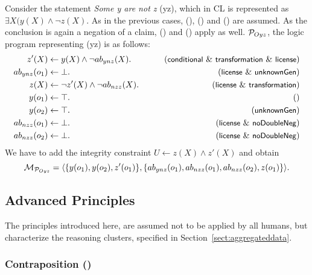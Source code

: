 \documentclass[12pt]{article}
\begin{document}
Consider the statement \textit{Some y are not z} ({\MO yz}), which in CL is represented as $\exists X (y(X) \wedge \neg z(X)$.
As in the previous cases, (\conditionals), (\licenses) and (\unknownGen) are assumed.
As the conclusion is again a negation of a claim, (\transformation) and
(\dnegation) apply as well. ${\cal P}_{Oyz}$, the logic program representing (\MO yz) is as follows:
\begin{align}
z'(X) & \leftarrow y(X) \wedge \neg \Ab_{ynz}(X). & \tag{\conditionals\ \&\ \transformation \ \&\ \licenses} \\
\Ab_{ynz}(o_1) & \leftarrow \bot. & \tag{\licenses\ \& \unknownGen} \\
z(X) & \leftarrow  \neg z'(X) \wedge \neg \Ab_{nzz}(X). &
\tag{\licenses\ \&\ \transformation} \\
y(o_1) & \leftarrow \top. & \tag{} \\
y(o_2) & \leftarrow \top. & \tag{\unknownGen} \\
\Ab_{nzz}(o_1)& \leftarrow \bot. & \tag{\licenses\ \&\ \dnegation}\\
\Ab_{nzz}(o_2)& \leftarrow \bot. & \tag{\licenses\ \&\ \dnegation}
\end{align}
We have to add the integrity constraint $U \leftarrow z(X) \wedge
z'(X)$
and obtain \[{\cal M}_{{\cal P}_{Oyz}} = \langle \{y(o_1), y(o_2), z'(o_1)\},\{ab_{ynz}(o_1),
ab_{nzz}(o_1), ab_{nzz}(o_2), z(o_1) \} \rangle.\]


\subsection{Advanced Principles}\label{sect:advanced}

The principles introduced here, are assumed not to be applied by all humans, 
but characterize the reasoning clusters, specified in Section~\ref{sect:aggregateddata}.


\subsubsection{Contraposition (\contraposition)}
\end{document}
